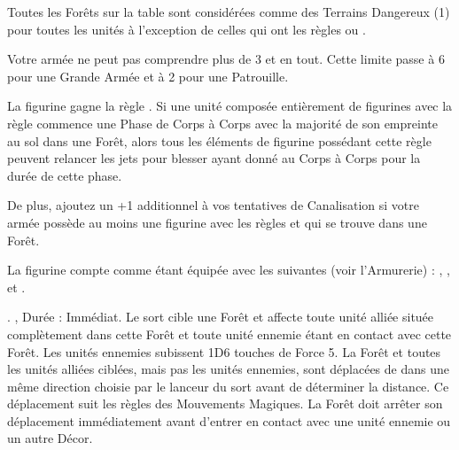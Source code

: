 Toutes les Forêts sur la table sont considérées comme des Terrains Dangereux (1) pour toutes les unités à l'exception de celles qui ont les règles \strider{} ou \strider{\forest}. 

\armyspecialruleentry{\therarestofspirits}

Votre armée ne peut pas comprendre plus de 3 \treefathers{} et \treefatherancients{} en tout. Cette limite passe à 6 pour une Grande Armée et à 2 pour une Patrouille.

\closearmywiderules






\vspace*{1.5cm}
\startarmyspecialrules

\armyspecialruleentry{\forestwalker}

La figurine gagne la règle \strider{\forest}. Si une unité composée entièrement de figurines avec la règle \forestwalker{} commence une Phase de Corps à Corps avec la majorité de son empreinte au sol dans une Forêt, alors tous les éléments de figurine possédant cette règle peuvent relancer les jets pour blesser ayant donné  au Corps à Corps pour la durée de cette phase.

De plus, ajoutez un +1 additionnel à vos tentatives de Canalisation si votre armée possède au moins une figurine avec les règles \channel{} et \forestwalker{} qui se trouve dans une Forêt. 

\armyspecialruleentry{\masterarcher}

La figurine compte comme étant équipée avec les \feyarrows{} suivantes (voir l'Armurerie) :\newline
\truemarkarrow{}, \starlightshaft{}, \perforatingtip{} et \jewelweedshot{}.

\armyspecialruleentry{\treesinging}

. , Durée : Immédiat.\newline
Le sort cible une Forêt et affecte toute unité alliée située complètement dans cette Forêt et toute unité ennemie étant en contact avec cette Forêt. Les unités ennemies subissent 1D6 touches de Force 5. La Forêt et toutes les unités alliées ciblées, mais pas les unités ennemies, sont déplacées de  dans une même direction choisie par le lanceur du sort avant de déterminer la distance. Ce déplacement suit les règles des Mouvements Magiques. La Forêt doit arrêter son déplacement immédiatement avant d'entrer en contact avec une unité ennemie ou un autre Décor.

